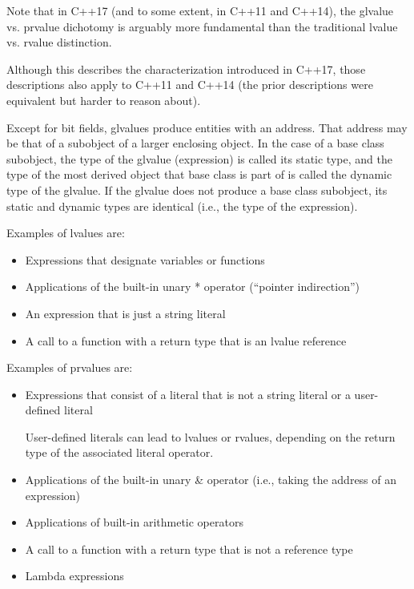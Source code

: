 Note that in C++17 (and to some extent, in C++11 and C++14), the glvalue vs. prvalue dichotomy is arguably more fundamental than the traditional lvalue vs. rvalue distinction.

Although this describes the characterization introduced in C++17, those descriptions also apply to C++11 and C++14 (the prior descriptions were equivalent but harder to reason about).

Except for bit fields, glvalues produce entities with an address. That address may be that of a subobject of a larger enclosing object. In the case of a base class subobject, the type of the glvalue (expression) is called its static type, and the type of the most derived object that base class is part of is called the dynamic type of the glvalue. If the glvalue does not produce a base class subobject, its static and dynamic types are identical (i.e., the type of the expression).

Examples of lvalues are:

\begin{itemize}
\item 
Expressions that designate variables or functions

\item 
Applications of the built-in unary * operator (“pointer indirection”)

\item 
An expression that is just a string literal

\item 
A call to a function with a return type that is an lvalue reference
\end{itemize}

Examples of prvalues are:

\begin{itemize}
\item 
Expressions that consist of a literal that is not a string literal or a user-defined literal

\begin{tcolorbox}[colback=webgreen!5!white,colframe=webgreen!75!black]
\hspace*{0.75cm}User-defined literals can lead to lvalues or rvalues, depending on the return type of the associated literal operator.
\end{tcolorbox}

\item 
Applications of the built-in unary \& operator (i.e., taking the address of an expression)

\item 
Applications of built-in arithmetic operators

\item 
A call to a function with a return type that is not a reference type

\item 
Lambda expressions
\end{itemize}

